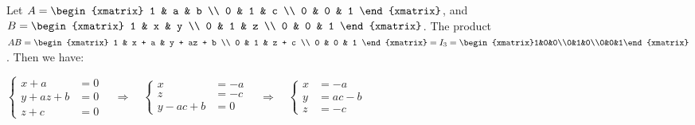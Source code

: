 \begin{exercise}{15}
  Let $A = \begin{xmatrix}
             1 & a & b \\
             0 & 1 & c \\
             0 & 0 & 1
           \end{xmatrix}$,
  and $B = \begin{xmatrix}
             1 & x & y \\
             0 & 1 & z \\
             0 & 0 & 1
           \end{xmatrix}$.
  The product $AB =
    \begin{xmatrix}
      1 & x + a & y + az + b \\
      0 &     1 &      z + c \\
      0 &     0 &          1
    \end{xmatrix} =
    I_3 = \begin{xmatrix}1&0&0\\0&1&0\\0&0&1\end{xmatrix}$.
  Then we have:

  $\left\{
    \begin{aligned}
           x + a &= 0 \\
      y + az + b &= 0 \\
           z + c &= 0
    \end{aligned}
  \right.\quad \Longrightarrow \quad
  \left\{
    \begin{aligned}
               x &= -a \\
               z &= -c \\
      y - ac + b &= 0
    \end{aligned}
  \right.\quad \Longrightarrow \quad
  \left\{
    \begin{aligned}
      x &= -a     \\
      y &= ac - b \\
      z &= -c
    \end{aligned}
  \right.$
\end{exercise}

